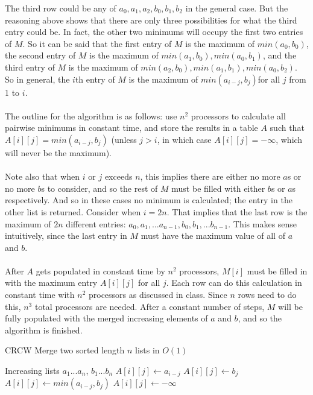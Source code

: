 \documentclass[letterpaper,notitlepage,twoside]{article}
\begin{document}
The third row could be any of $a_0, a_1, a_2, b_0, b_1, b_2$ in the general case. But the reasoning above shows that there are only three possibilities for what the third entry could be. In fact, the other two minimums will occupy the first two entries of $M$. So it can be said that the first entry of $M$ is the maximum of $min(a_0, b_0)$, the second entry of $M$ is the maximum of $min(a_1, b_0), min(a_0, b_1)$, and the third entry of $M$ is the maximum of $min(a_2, b_0), min(a_1, b_1), min(a_0, b_2)$. So in general, the $i$th entry of $M$ is the maximum of $min(a_{i - j}, b_j)$for all $j$ from 1 to $i$.
\\\\
The outline for the algorithm is as follows: use $n^2$ processors to calculate all pairwise minimums in constant time, and store the results in a table $A$ such that $A[i][j] = min(a_{i - j}, b_j)$ (unless $j > i$, in which case $A[i][j] = -\infty$, which will never be the maximum).
\\\\
Note also that when $i$ or $j$ exceeds $n$, this implies there are either no more $a$s or no more $b$s to consider, and so the rest of $M$ must be filled with either $b$s or $a$s respectively. And so in these cases no minimum is calculated; the entry in the other list is returned. Consider when $i = 2n$. That implies that the last row is the maximum of $2n$ different entries: $a_0, a_1, ... a_{n - 1}, b_0, b_1, ... b_{n - 1}$. This makes sense intuitively, since the last entry in $M$ must have the maximum value of all of $a$ and $b$.
\\\\
After $A$ gets populated in constant time by $n^2$ processors, $M[i]$ must be filled in with the maximum entry $A[i][j]$ for all $j$. Each row can do this calculation in constant time with $n^2$ processors as discussed in class. Since $n$ rows need to do this, $n^3$ total processors are needed. After a constant number of steps, $M$ will be fully populated with the merged increasing elements of $a$ and $b$, and so the algorithm is finished.

\begin{algorithm}[H]
	\begin{algorithmic}%
		\caption{CRCW Merge two sorted length $n$ lists in $O(1)$}
		\Require Increasing lists $a_1...a_n$, $b_1...b_n$
		 
				\State $A[i][j] \gets a_{i - j}$
				\State $A[i][j] \gets b_j$
			\Else
				\State $A[i][j] \gets min(a_{i - j}, b_j)$
			\EndIf
		\Else
			\State $A[i][j] \gets -\infty$
		\EndIf
		
		
	\end{algorithmic}
\end{algorithm}
\end{document}
